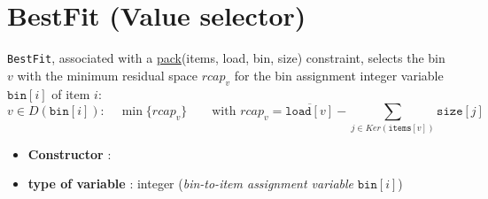 \section{BestFit (Value selector)}\label{bestfit:bestfitvalselector}\hypertarget{bestfit:bestfitvalselector}{}
\begin{notedef}
  \texttt{BestFit}, associated with a \hyperlink{pack:packconstraint}{pack}(items, load, bin, size) constraint, selects the bin $v$ with the minimum residual space $rcap_v$ for the bin assignment integer variable $\mathtt{bin}[i]$ of item $i$:
$$v\in D(\mathtt{bin}[i]):\quad\min\{rcap_v\}\qquad\text{with } rcap_v=\overline{\mathtt{load}[v]} -\!\sum_{j\in Ker(\mathtt{items}[v])}\!\mathtt{size}[j]$$
\end{notedef}

\begin{itemize}
	\item \textbf{Constructor} : 
	\item \textbf{type of variable} : integer (\emph{bin-to-item assignment variable} $\mathtt{bin}[i]$)
\end{itemize}

%

